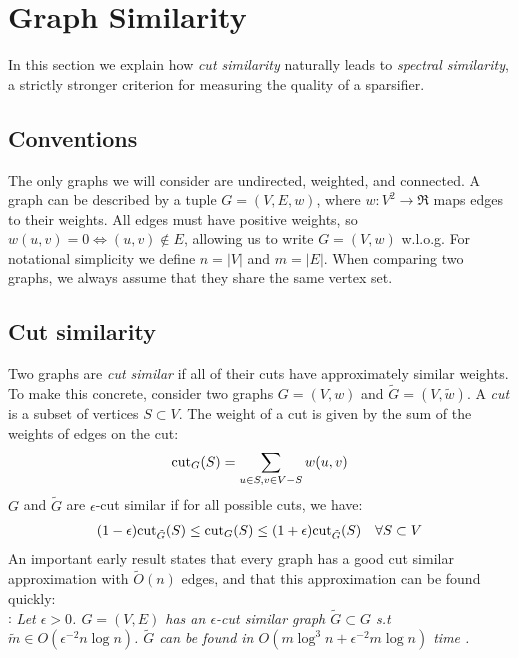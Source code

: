 \documentclass{article}
\begin{document}
\section{Graph Similarity}

In this section we explain how \textit{cut similarity} naturally leads to
\textit{spectral similarity}, a strictly stronger criterion for measuring
the quality of a sparsifier. 

\subsection{Conventions}

The only graphs we will consider are undirected, weighted, and connected. A
graph can be described by a tuple $G = (V, E, w)$, where $w : V^2
\rightarrow \Re$ maps edges to their weights. All edges must have positive
weights, so $w(u, v) = 0 \Leftrightarrow (u, v) \not\in E$, allowing us to
write $G = (V, w)$ w.l.o.g. For notational simplicity we define $n = |V|$
and $m = |E|$. When comparing two graphs, we always assume that they share
the same vertex set.

\subsection{Cut similarity}

Two graphs are \textit{cut similar} if all of their cuts have approximately
similar weights. To make this concrete, consider two graphs $G = (V, w)$ and
$\tilde{G} = (V, \tilde{w})$. A \textit{cut} is a subset of vertices $S
\subset V$.  The weight of a cut is given by the sum of the weights of edges
on the cut:
\begin{align*}
    \text{cut}_{G}(S) = \sum_{u \in S, v \in V - S} w(u, v)
\end{align*}
$G$ and $\tilde{G}$ are $\epsilon$-cut similar if for all possible cuts, we
have:
\begin{align*}
    (1 - \epsilon)\text{cut}_{\tilde{G}}(S) \leq \text{cut}_{G}(S) \leq (1 +
    \epsilon)\text{cut}_{\tilde{G}}(S) \quad \forall{S \subset V}
\end{align*}
An important early result states that every graph has a good cut similar
approximation with $\tilde{O}(n)$ edges, and that this approximation can be
found quickly: \\

\noindent
{}: \textit{Let $\epsilon > 0$. $G =
(V, E)$ has an $\epsilon$-cut similar graph $\tilde{G} \subset G$ s.t
$\tilde{m} \in O(\epsilon^{-2}n\log n)$. $\tilde{G}$ can be found in
$O(m\log^3n + \epsilon^{-2}m\log n)$ time \cite{BenczurKarger}.} \\
\end{document}
